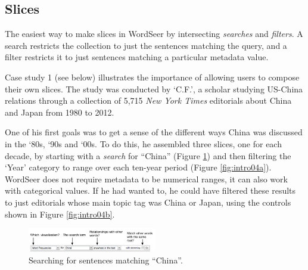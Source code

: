 \documentclass{sig-alternate}
\begin{document}
\subsection{Slices}

The easiest way to make slices in WordSeer by intersecting \emph{searches} and \emph{filters}.  A search restricts the collection to just the sentences matching the query, and a filter restricts it to just sentences matching a particular metadata value. 

Case study 1 (see below) illustrates the importance of allowing users to compose their own slices. The study was conducted by  `C.F.',  a scholar studying US-China relations through a collection of 5,715  \emph{New York Times} editorials about China and Japan from 1980 to 2012. 

One of his first goals was to get a sense of the different ways China was discussed in the `80s, `90s and `00s. To do this, he assembled three slices, one for each decade, by starting with a \emph{search} for ``China'' (Figure \ref{fig:intro03})  and then filtering the `Year' category to range over each ten-year period (Figure \ref{fig:intro04a}).  WordSeer does not require metadata to be numerical ranges, it can also work with categorical values. If he had wanted to, he could have filtered these results to just editorials whose main topic tag was China or Japan, using the controls shown in Figure \ref{fig:intro04b}. 
\begin{figure}[ht!]
\begin{center}
	\includegraphics[width=0.5\textwidth]{fig/intro/03b.png}
\end{center}
    \caption{%
        Searching for sentences matching ``China''.\label{fig:intro03}
     }%
\end{figure}
\end{document}
